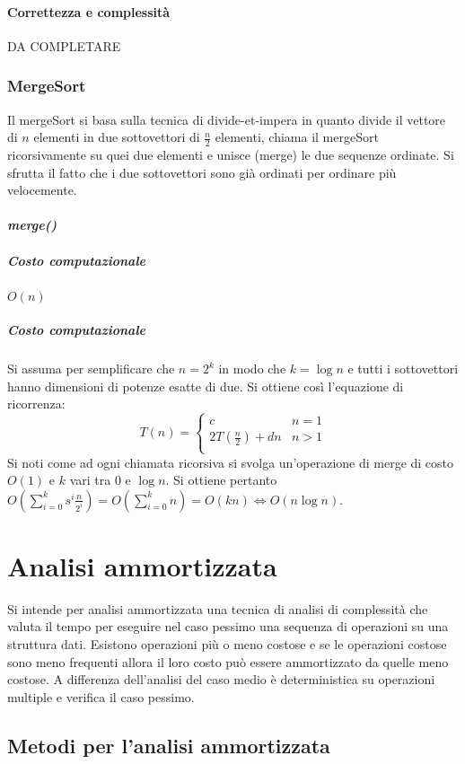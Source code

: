 \paragraph{Correttezza e complessit\`a}
DA COMPLETARE
\subsubsection{MergeSort}
Il mergeSort si basa sulla tecnica di divide-et-impera in quanto divide il vettore di $n$ elementi in due sottovettori di $\frac{n}{2}$ elementi, chiama il
mergeSort ricorsivamente su quei due elementi e unisce (merge) le due sequenze ordinate. Si sfrutta il fatto che i due sottovettori sono gi\`a ordinati per
ordinare pi\`u velocemente.
\paragraph{\emph{merge()}}

\subparagraph{Costo computazionale} $O(n)$

\subparagraph{Costo computazionale} Si assuma per semplificare che $n = 2^k$ in modo che $k=\log n$ e tutti i sottovettori hanno dimensioni di potenze 
esatte di due. Si ottiene cos\`i l'equazione di ricorrenza:
\begin{equation*}
T(n)=\begin{cases}
c\quad\quad & n=1\\
2T(\frac{n}{2})+dn & n>1\\
\end{cases}
\end{equation*}
Si noti come ad ogni chiamata ricorsiva si svolga un'operazione di merge di costo $O(1)$ e $k$ vari tra $0$ e $\log n$. Si ottiene pertanto 
$O(\sum\limits_{i=0}^ks^i\frac{n}{2^i})=O(\sum\limits_{i=0}^kn)=O(kn)\Leftrightarrow O(n\log n)$. 
\section{Analisi ammortizzata}
Si intende per analisi ammortizzata una tecnica di analisi di complessit\`a che valuta il tempo per eseguire nel caso pessimo una sequenza di operazioni 
su una struttura dati. Esistono operazioni pi\`u o meno costose e se le operazioni costose sono meno frequenti allora il loro costo pu\`o essere 
ammortizzato da quelle meno costose. A differenza dell'analisi del caso medio \`e deterministica su operazioni multiple e verifica il caso pessimo.
\subsection{Metodi per l'analisi ammortizzata}
